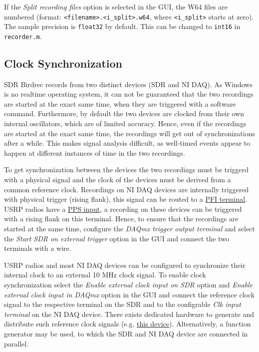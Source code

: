 \documentclass[10pt]{article}
\begin{document}
\subsubsection{}\label{section}

If the \emph{Split recording files} option is selected in the GUI, the
W64 files are numbered (format:
\texttt{\textless{}filename\textgreater{}.\textless{}i\_split\textgreater{}.w64},
where \texttt{\textless{}i\_split\textgreater{}} starts at zero). The
sample precision is \texttt{float32} by default. This can be changed to
\texttt{int16} in \texttt{recorder.m}.

\subsection{Clock Synchronization}\label{clock-synchronization}

SDR Birdrec records from two distinct devices (SDR and NI DAQ). As
Windows is no realtime operating system, it can not be guaranteed that
the two recordings are started at the exact same time, when they are
triggered with a software command. Furthermore, by default the two
devices are clocked from their own internal oscillators, which are of
limited accuracy. Hence, even if the recordings are started at the exact
same time, the recordings will get out of synchronizations after a
while. This makes signal analysis difficult, as well-timed events appear
to happen at different instances of time in the two recordings.

To get synchronization between the devices the two recordings must be
triggerd with a physical signal and the clock of the devices must be
derived from a common reference clock. Recordings on NI DAQ devices are
internally triggered with physical trigger (rising flank), this signal
can be routed to a
\href{http://zone.ni.com/reference/en-XX/help/370466AE-01/TOC18.htm}{PFI
terminal}. USRP radios have a
\href{https://files.ettus.com/manual/page_sync.html}{PPS input}, a
recording on these devices can be triggered with a rising flank on this
terminal. Hence, to ensure that the recordings are started at the same
time, configure the \emph{DAQmx trigger output terminal} and select the
\emph{Start SDR on external trigger} option in the GUI and connect the
two terminals with a wire.

USRP radios and most NI DAQ devices can be configured to synchronize
their internal clock to an external 10 MHz clock signal. To enable clock
synchronization select the \emph{Enable external clock input on SDR}
option and \emph{Enable external clock input in DAQmx} option in the GUI
and connect the reference clock signal to the respective terminal on the
SDR and to the configrable \emph{Clk input terminal} on the NI DAQ
device. There exists dedicated hardware to generate and distribute such
reference clock signals (e.g.
\href{https://www.ettus.com/product/details/OctoClock-G}{this device}).
Alternatively, a function generator may be used, to which the SDR and NI
DAQ device are connected in parallel.
\end{document}
